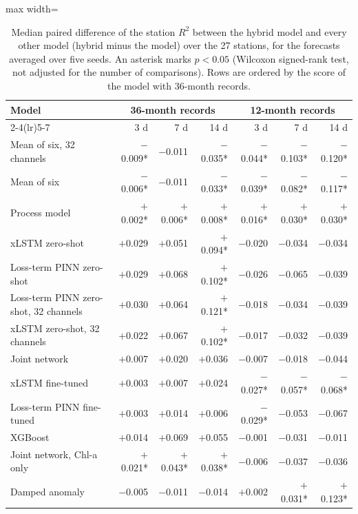 \begin{table}[tbp]
\centering
\caption{Median paired difference of the station $R^2$ between the hybrid model and every other model (hybrid minus the model) over the 27 stations, for the forecasts averaged over five seeds. An asterisk marks $p < 0.05$ (Wilcoxon signed-rank test, not adjusted for the number of comparisons). Rows are ordered by the score of the model with 36-month records.}
\label{tab:S_paired}
\footnotesize
\setlength{\tabcolsep}{3.5pt}
\begin{adjustbox}{max width=\textwidth}
\begin{tabular}{lrrrrrr}
\toprule
Model & \multicolumn{3}{c}{36-month records} & \multicolumn{3}{c}{12-month records} \\ \cmidrule(lr){2-4}\cmidrule(lr){5-7}
 & 3 d & 7 d & 14 d & 3 d & 7 d & 14 d \\
\midrule
Mean of six, 32 channels & $-$0.009* & $-$0.011 & $-$0.035* & $-$0.044* & $-$0.103* & $-$0.120* \\
Mean of six & $-$0.006* & $-$0.011 & $-$0.033* & $-$0.039* & $-$0.082* & $-$0.117* \\
Process model & $+$0.002* & $+$0.006* & $+$0.008* & $+$0.016* & $+$0.030* & $+$0.030* \\
xLSTM zero-shot & $+$0.029 & $+$0.051 & $+$0.094* & $-$0.020 & $-$0.034 & $-$0.034 \\
Loss-term PINN zero-shot & $+$0.029 & $+$0.068 & $+$0.102* & $-$0.026 & $-$0.065 & $-$0.039 \\
Loss-term PINN zero-shot, 32 channels & $+$0.030 & $+$0.064 & $+$0.121* & $-$0.018 & $-$0.034 & $-$0.039 \\
xLSTM zero-shot, 32 channels & $+$0.022 & $+$0.067 & $+$0.102* & $-$0.017 & $-$0.032 & $-$0.039 \\
Joint network & $+$0.007 & $+$0.020 & $+$0.036 & $-$0.007 & $-$0.018 & $-$0.044 \\
xLSTM fine-tuned & $+$0.003 & $+$0.007 & $+$0.024 & $-$0.027* & $-$0.057* & $-$0.068* \\
Loss-term PINN fine-tuned & $+$0.003 & $+$0.014 & $+$0.006 & $-$0.029* & $-$0.053 & $-$0.067 \\
XGBoost & $+$0.014 & $+$0.069 & $+$0.055 & $-$0.001 & $-$0.031 & $-$0.011 \\
Joint network, Chl-a only & $+$0.021* & $+$0.043* & $+$0.038* & $-$0.006 & $-$0.037 & $-$0.036 \\
Damped anomaly & $-$0.005 & $-$0.011 & $-$0.014 & $+$0.002 & $+$0.031* & $+$0.123* \\

\end{tabular}
\end{adjustbox}
\end{table}
